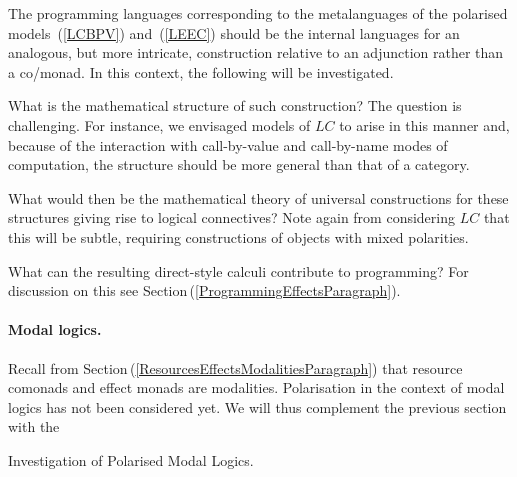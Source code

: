 \documentclass[11pt,twocolumn]{article}
\newcounter{CC}
\newenvironment{resenumerate}
  {\begin{list}{[\textbf{\arabic{CC}]}}
  {\usecounter{CC}
   \setlength{\topsep}{2pt}
   \setlength{\partopsep}{2pt}
   \setlength{\itemsep}{2.5pt}
   \setlength{\parsep}{2.5pt}
   \setlength{\leftmargin}{1.65em}
   \setlength{\labelwidth}{1.15em}
 }}
  {\end{list}}
\newcommand{\hide}[1]{}
\newcommand{\hidenote}{\hide}
\newcommand{\pref}[1]{\,(\ref{#1})}
\newcommand{\LC}{\mbox{$LC$}}
\begin{document}
The programming languages corresponding to the metalanguages of the
polarised models~(\ref{LCBPV}) and~(\ref{LEEC}) should be the internal
languages for an analogous, but more intricate, construction relative to
an adjunction rather than a co/monad.  In this context, the following will
be investigated.
\begin{resenumerate}\setcounter{CC}{4}
\item
  What is the mathematical structure of such construction?  
  The question is challenging.  For instance, we envisaged models of {\LC} to
  arise in this manner and, because of the interaction with call-by-value and
  call-by-name modes of computation, the structure should be more general than
  that of a category.

\item
  What would then be the mathematical theory of universal constructions for
  these structures giving rise to logical connectives?  
  Note again from considering {\LC} that this will be subtle, requiring
  constructions of objects with mixed polarities.

\item
  What can the resulting direct-style calculi contribute to programming?
  For discussion on this see Section\pref{ProgrammingEffectsParagraph}.
\end{resenumerate}

\hidenote{polarised dialectica for program extraction motivated by
  polarised dialectica category construction}

\hidenote{Investigate relationship to Chuck Liang \& Dale Miller's work}

\hidenote{Investigate relationship to Oleg Kiselyov and Chung-chieh Shan's
  substructural type system for delimited control}

\paragraph{Modal logics.}
\label{ModalLogicsParagraph}

Recall from Section\pref{ResourcesEffectsModalitiesParagraph} that resource
comonads and effect monads are modalities.  Polarisation in the context of
modal logics has not been considered yet.  We will thus complement the
previous section with the 
\begin{resenumerate}\setcounter{CC}{0}
\item
  Investigation of Polarised Modal Logics.
\end{resenumerate}
\end{document}
